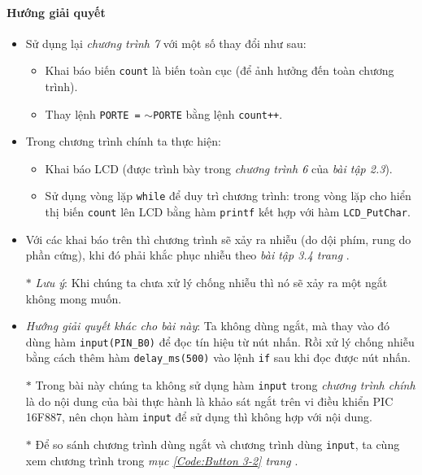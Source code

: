 \paragraph{Hướng giải quyết}
\begin{itemize}
\item Sử dụng lại \emph{chương trình 7} với một số thay đổi như sau:
\begin{itemize}
\item Khai báo biến \verb|count| là biến toàn cục (để ảnh hưởng đến toàn chương trình).
\item Thay lệnh \verb|PORTE =| $\sim$\verb|PORTE| bằng lệnh \verb|count++|.
\end{itemize}
\item Trong chương trình chính ta thực hiện:
\begin{itemize}
\item Khai báo LCD (được trình bày trong \emph{chương trình 6} của \emph{bài tập 2.3}).
\item Sử dụng vòng lặp \verb|while| để duy trì chương trình: trong vòng lặp cho hiển thị biến \verb|count| lên LCD bằng hàm \verb|printf| kết hợp với hàm \verb|LCD_PutChar|.
\end{itemize}
\item Với các khai báo trên thì chương trình sẽ xảy ra nhiễu (do dội phím, rung do phần cứng), khi đó phải khắc phục nhiễu theo \textit{bài tập 3.4 trang \pageref{Ex:3-4}}.
\item[$\ast$] \textit{Lưu ý}: Khi chúng ta chưa xử lý chống nhiễu thì nó sẽ xảy ra một ngắt không mong muốn.
\item \textit{Hướng giải quyết khác cho bài này}: Ta không dùng ngắt, mà thay vào đó dùng hàm \verb|input(PIN_B0)| để đọc tín hiệu từ nút nhấn. Rồi xử lý chống nhiễu bằng cách thêm hàm \verb|delay_ms(500)| vào lệnh \verb|if| sau khi đọc được nút nhấn.
\item[$\ast$] Trong bài này chúng ta không sử dụng hàm \verb|input| trong \textit{chương trình chính} là do nội dung của bài thực hành là khảo sát ngắt trên vi điều khiển PIC 16F887, nên chọn hàm \verb|input| để sử dụng thì không hợp với nội dung.
\item[$\ast$] Để so sánh chương trình dùng ngắt và chương trình dùng \verb|input|, ta cùng xem chương trình trong \textit{mục \ref{Code:Button 3-2} trang \pageref{Code:Button 3-2}}.
\end{itemize}
